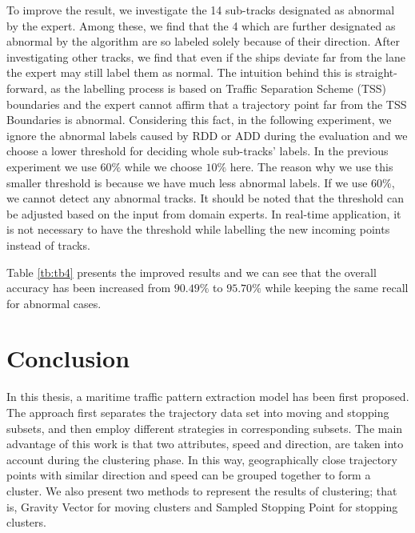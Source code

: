 \documentclass[12pt,glossary]{dalcsthesis}
\begin{document}
To improve the result, we investigate the 14 sub-tracks designated as abnormal by the expert. Among these, we find that the 4 which are further designated as abnormal by the algorithm are so labeled solely because of their direction. After investigating other tracks, we find that
even if the ships deviate far from the lane the expert may still label them as normal. The intuition behind this is straight-forward, as the labelling process is based on Traffic Separation Scheme (TSS) \cite{tss} boundaries and the expert cannot affirm that a trajectory point far from the TSS Boundaries is abnormal. %
Considering this fact, in the following experiment, we ignore the abnormal labels caused by RDD or ADD during the evaluation and we choose a lower threshold for deciding  whole sub-tracks' labels. In the previous experiment we use $60\%$ while we choose $10\%$ here. The reason why we use this smaller threshold is because we have much less abnormal labels. If we use $60\%$, we cannot detect any abnormal tracks. It should be noted that the threshold can be adjusted based on the input from domain experts. In real-time application, it is not necessary to have the threshold while labelling the new incoming points instead of tracks.

Table \ref{tb:tb4} presents the improved results and we can see that the overall accuracy has been increased from $90.49\%$ to $95.70\%$ while keeping the same recall for abnormal cases.




\chapter{Conclusion}
\label{ch:conclusion}


In this thesis, a maritime traffic pattern extraction model has been first proposed. The approach first separates the trajectory data set into moving and stopping subsets, and then employ different strategies in corresponding subsets. The main advantage of this work is that two attributes, speed and direction, are taken into account during the clustering phase. In this way, geographically close trajectory points with similar direction and speed can be grouped together to form a cluster. We also present two methods to represent the results of clustering; that is, Gravity Vector for moving clusters and Sampled Stopping Point for stopping clusters.  %
\end{document}
